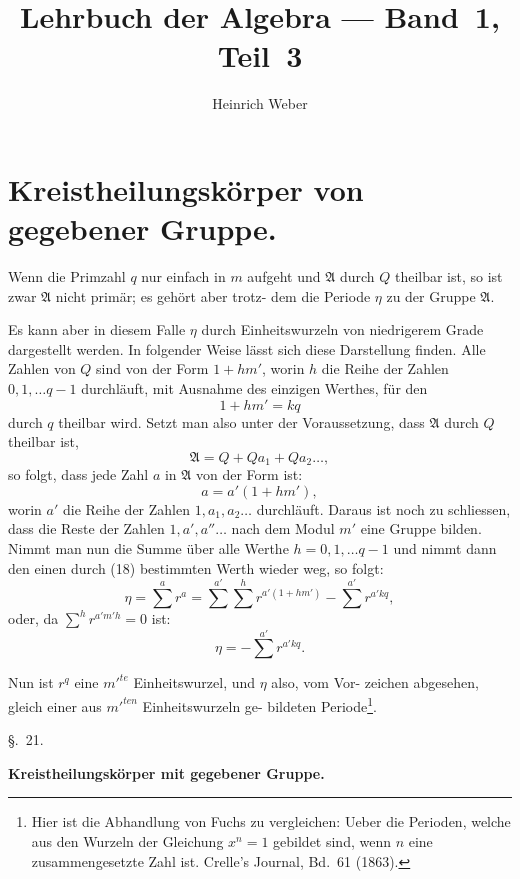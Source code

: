 \documentclass[12pt,a4paper]{article}
\title{Lehrbuch der Algebra --- Band~1, Teil~3}
\author{Heinrich Weber}
\date{}
\begin{document}
\maketitle
\thispagestyle{empty}

\setcounter{section}{20}

\section{Kreistheilungskörper von gegebener Gruppe.}
\label{sec:21}

Wenn die Primzahl $q$ nur einfach in $m$ aufgeht und $\mathfrak{A}$ durch
$Q$ theilbar ist, so ist zwar $\mathfrak{A}$ nicht primär; es gehört aber trotz-
dem die Periode $\eta$ zu der Gruppe $\mathfrak{A}$.

Es kann aber in diesem Falle $\eta$ durch Einheitswurzeln von
niedrigerem Grade dargestellt werden. In folgender Weise lässt
sich diese Darstellung finden. Alle Zahlen von $Q$ sind von der
Form $1 + hm'$, worin $h$ die Reihe der Zahlen $0,1,\ldots q-1$
durchläuft, mit Ausnahme des einzigen Werthes, für den
\begin{equation}\label{eq:18}
1 + hm' = kq
\end{equation}
durch $q$ theilbar wird. Setzt man also unter der Voraussetzung,
dass $\mathfrak{A}$ durch $Q$ theilbar ist,
\[
\mathfrak{A} = Q + Qa_1 + Qa_2 \ldots,
\]
so folgt, dass jede Zahl $a$ in $\mathfrak{A}$ von der Form ist:
\begin{equation}\label{eq:19}
a = a'(1 + hm'),
\end{equation}
worin $a'$ die Reihe der Zahlen $1, a_1, a_2 \ldots$ durchläuft. Daraus
ist noch zu schliessen, dass die Reste der Zahlen $1, a', a'' \ldots$
nach dem Modul $m'$ eine Gruppe bilden. Nimmt man nun die
Summe über alle Werthe $h = 0, 1, \ldots q-1$ und nimmt dann
den einen durch (18) bestimmten Werth wieder weg, so folgt:
\[
\eta = \sum^{a} r^a = \sum^{a'} \sum^{h} r^{a'(1+hm')} - \sum^{a'} r^{a'kq},
\]
oder, da $\sum^{h} r^{a'm'h} = 0$ ist:
\[
\eta = -\sum^{a'} r^{a'kq}.
\]

Nun ist $r^q$ eine $m'^{te}$ Einheitswurzel, und $\eta$ also, vom Vor-
zeichen abgesehen, gleich einer aus $m'^{ten}$ Einheitswurzeln ge-
bildeten Periode\footnote{Hier ist die Abhandlung von Fuchs zu vergleichen: Ueber die
Perioden, welche aus den Wurzeln der Gleichung $x^n = 1$ gebildet sind,
wenn $n$ eine zusammengesetzte Zahl ist. Crelle's Journal, Bd.~61 (1863).}.

\medskip
\begin{center}
\S.~21.
\end{center}
\begin{center}
\large\bfseries Kreistheilungskörper mit gegebener Gruppe.
\end{center}
\end{document}
